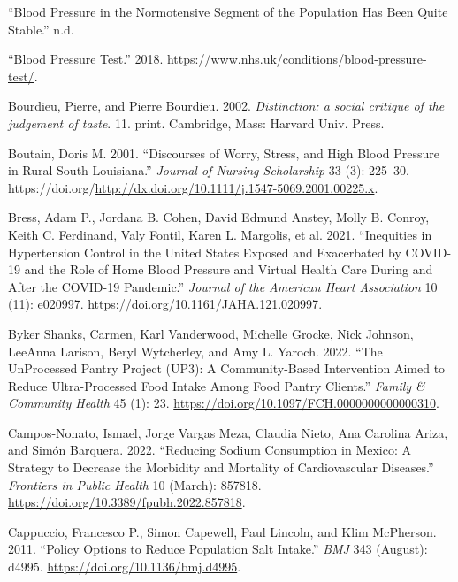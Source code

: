 \documentclass[
]{article}
\newlength{\cslhangindent}
\newlength{\cslentryspacingunit} %
\newenvironment{CSLReferences}[2] %
 {%
  \setlength{\parindent}{0pt}
  \ifodd #1
  \let\oldpar\par
  \def\par{\hangindent=\cslhangindent\oldpar}
  \fi
  \setlength{\parskip}{#2\cslentryspacingunit}
 }%
 {}
\begin{document}
\begin{CSLReferences}{1}{0}
\leavevmode{}%
{``Blood Pressure in the Normotensive Segment of the Population Has Been
Quite Stable.''} n.d.

\leavevmode{}%
{``Blood Pressure Test.''} 2018.
\url{https://www.nhs.uk/conditions/blood-pressure-test/}.

\leavevmode{}%
Bourdieu, Pierre, and Pierre Bourdieu. 2002. \emph{Distinction: a social
critique of the judgement of taste}. 11. print. Cambridge, Mass: Harvard
Univ. Press.

\leavevmode{}%
Boutain, Doris M. 2001. {``Discourses of Worry, Stress, and High Blood
Pressure in Rural South Louisiana.''} \emph{Journal of Nursing
Scholarship} 33 (3): 225--30.
https://doi.org/\url{http://dx.doi.org/10.1111/j.1547-5069.2001.00225.x}.

\leavevmode{}%
Bress, Adam P., Jordana B. Cohen, David Edmund Anstey, Molly B. Conroy,
Keith C. Ferdinand, Valy Fontil, Karen L. Margolis, et al. 2021.
{``Inequities in Hypertension Control in the United States Exposed and
Exacerbated by COVID{-}19 and the Role of Home Blood Pressure and
Virtual Health Care During and After the COVID{-}19 Pandemic.''}
\emph{Journal of the American Heart Association} 10 (11): e020997.
\url{https://doi.org/10.1161/JAHA.121.020997}.

\leavevmode{}%
Byker Shanks, Carmen, Karl Vanderwood, Michelle Grocke, Nick Johnson,
LeeAnna Larison, Beryl Wytcherley, and Amy L. Yaroch. 2022. {``The
UnProcessed Pantry Project (UP3): A Community-Based Intervention Aimed
to Reduce Ultra-Processed Food Intake Among Food Pantry Clients.''}
\emph{Family \& Community Health} 45 (1): 23.
\url{https://doi.org/10.1097/FCH.0000000000000310}.

\leavevmode{}%
Campos-Nonato, Ismael, Jorge Vargas Meza, Claudia Nieto, Ana Carolina
Ariza, and Simón Barquera. 2022. {``Reducing Sodium Consumption in
Mexico: A Strategy to Decrease the Morbidity and Mortality of
Cardiovascular Diseases.''} \emph{Frontiers in Public Health} 10
(March): 857818. \url{https://doi.org/10.3389/fpubh.2022.857818}.

\leavevmode{}%
Cappuccio, Francesco P., Simon Capewell, Paul Lincoln, and Klim
McPherson. 2011. {``Policy Options to Reduce Population Salt Intake.''}
\emph{BMJ} 343 (August): d4995. \url{https://doi.org/10.1136/bmj.d4995}.


\end{CSLReferences}
\end{document}

